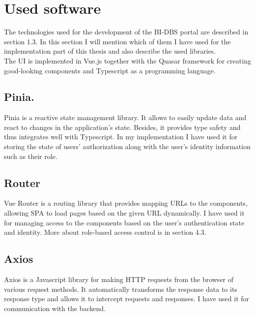 \section{Used software} The technologies used for the development of the BI-DBS portal are described in section 1.3. In this section I will mention which of them I have used for the implementation part of this thesis and also describe the used libraries.\\
The UI is implemented in Vue.js \cite{vue-docs} together with the Quasar framework \cite{quasar-doc} for creating good-looking components and Typescript \cite{typescript-doc} as a programming language. 

\subsection{Pinia.} Pinia is a reactive state management library. It allows to easily update data and react to changes in the application's state. Besides, it provides type safety and thus integrates well with Typescript. In my implementation I have used it for storing the state of users' authorization along with the user's identity information such as their role. \cite{pinia-docs}

\subsection{Router} Vue Router is a routing library that provides mapping URLs to the components, allowing SPA to load pages based on the given URL dynamically. I have used it for managing access to the components based on the user's authentication state and identity. More about role-based access control is in section 4.3. \cite{router-doc}

\subsection{Axios} Axios is a Javascript library for making HTTP requests from the browser of various request methods. It automatically transforms the response data to its response type and allows it to intercept requests and responses. I have used it for communication with the backend. \cite{axios-docs}


